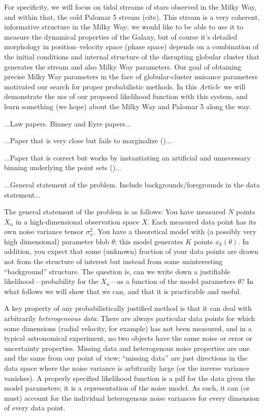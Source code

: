 \documentclass[12pt,pdftex,preprint]{aastex}
\newcommand{\documentname}{\textsl{Article}}
\begin{document}
For specificity, we will focus on tidal streams of stars observed in
the Milky Way, and within that, the cold Palomar 5 stream (cite).
This stream is a very coherent, informative structure in the Milky
Way; we would like to be able to use it to measure the dynamical
properties of the Galaxy, but of course it's detailed morphology in
position--velocity space (phase space) depends on a combination of the
initial conditions and internal structure of the disrupting globular
cluster that generates the stream and also Milky Way parameters.  Our
goal of obtaining precise Milky Way parameters in the face of
globular-cluster nuisance parameters motivated our search for proper
probabilistic methods.  In this \documentname\ we will demonstrate the
use of our proposed likelihood function with this system, and learn
something (we hope) about the Milky Way and Palomar 5 along the way.

...Law papers.  Binney and Eyre papers...

...Paper that is very close but fails to marginalize
(\citealt{varghese})...

...Paper that is correct but works by instantiating an artificial and
unnecessary binning underlying the point sets (\citealt{saha})...

...General statement of the problem.  Include backgrounds/foregrounds
in the data statement...

The general statement of the problem is as follows: You have measured
$N$ points $X_n$ in a high-dimensional observation space $X$.  Each
measured data point has its own noise variance tensor $\sigma^2_n$.
You have a theoretical model with (a possibly very high dimensional)
parameter blob $\theta$; this model generates $K$ points
$x_k(\theta)$.  In addition, you expect that some (unknown) fraction
of your data points are drawn not from the structure of interest but
instead from some uninteresting ``background'' structure.  The
question is, can we write down a justifiable likelihood---probability
for the $X_n$---as a function of the model parameters $\theta$?  In
what follows we will show that we can, and that it is practicable and
useful.

A key property of any probabilistically justified method is that it
can deal with arbitrarily \emph{heterogeneous data}:
There are always particular data points for which some dimensions
(radial velocity, for example) has not been measured, and in a typical
astronomical experiment, no two objects have the same noise or error
or uncertainty properties.
Missing data and heterogenous noise properties are one and the same
from our point of view; ``missing data'' are just directions in the
data space where the noise variance is arbitrarily large (or the
inverse variance vanishes).
A properly specified likelihood function is a pdf for the data given
the model parameters; it is a representation of the noise model.
As such, it can (or must) account for the individual heterogenous
noise variances for every dimension of every data point.
\end{document}
